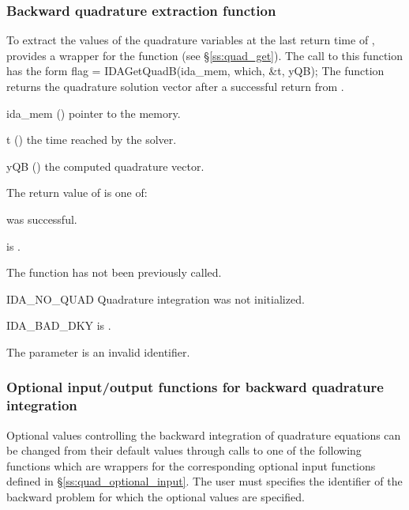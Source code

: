 \subsubsection{Backward quadrature extraction function}
\label{sss:quad_get_b}
To extract the values of the quadrature variables at the last return time
of , {\idas} provides a wrapper for the function 
(see \S\ref{ss:quad_get}). The call to this function has the form
{
  flag = IDAGetQuadB(ida\_mem, which, \&t, yQB);
}
{
  The function  returns the quadrature solution vector after
  a successful return from .
}
{
  \begin{args}
  \item[ida\_mem] ()
    pointer to the {\idas} memory.
  \item[t] ()
    the time reached by the solver.
  \item[yQB] ()
    the computed quadrature vector.
  \end{args}
}
{
  The return value  of  is one of:
  \begin{args}
  \item[\Id{IDA\_SUCCESS}] 
     was successful.
  \item[\Id{IDA\_MEM\_NULL}] 
     is .
  \item[\Id{IDA\_NO\_ADJ}]
    The function  has not been previously called.
  \item[IDA\_NO\_QUAD] 
    Quadrature integration was not initialized.
  \item[IDA\_BAD\_DKY] 
     is .
  \item[\Id{IDA\_ILL\_INPUT}]
    The parameter  is an invalid identifier.
  \end{args}
}
{}

\subsubsection{Optional input/output functions for backward quadrature integration}
\label{sss:quad_optional_input_B}
Optional values controlling the backward integration of quadrature equations can be 
changed from their default values through calls to one of the following functions 
which are wrappers for the corresponding optional input functions defined in 
\S\ref{ss:quad_optional_input}. The user must specifies  the identifier  
of the backward problem for which the optional values are specified.

